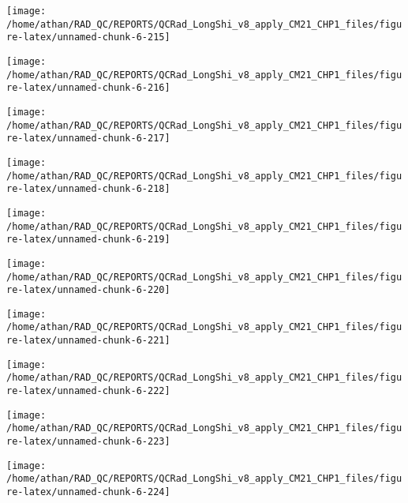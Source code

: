 \documentclass[
  10pt,
  a4paper,oneside]{article}
\begin{document}
\begin{center}\texttt{[image: /home/athan/RAD\_QC/REPORTS/QCRad\_LongShi\_v8\_apply\_CM21\_CHP1\_files/figure-latex/unnamed-chunk-6-215]} \end{center}

\begin{center}\texttt{[image: /home/athan/RAD\_QC/REPORTS/QCRad\_LongShi\_v8\_apply\_CM21\_CHP1\_files/figure-latex/unnamed-chunk-6-216]} \end{center}

\begin{center}\texttt{[image: /home/athan/RAD\_QC/REPORTS/QCRad\_LongShi\_v8\_apply\_CM21\_CHP1\_files/figure-latex/unnamed-chunk-6-217]} \end{center}

\begin{center}\texttt{[image: /home/athan/RAD\_QC/REPORTS/QCRad\_LongShi\_v8\_apply\_CM21\_CHP1\_files/figure-latex/unnamed-chunk-6-218]} \end{center}

\begin{center}\texttt{[image: /home/athan/RAD\_QC/REPORTS/QCRad\_LongShi\_v8\_apply\_CM21\_CHP1\_files/figure-latex/unnamed-chunk-6-219]} \end{center}

\begin{center}\texttt{[image: /home/athan/RAD\_QC/REPORTS/QCRad\_LongShi\_v8\_apply\_CM21\_CHP1\_files/figure-latex/unnamed-chunk-6-220]} \end{center}

\begin{center}\texttt{[image: /home/athan/RAD\_QC/REPORTS/QCRad\_LongShi\_v8\_apply\_CM21\_CHP1\_files/figure-latex/unnamed-chunk-6-221]} \end{center}

\begin{center}\texttt{[image: /home/athan/RAD\_QC/REPORTS/QCRad\_LongShi\_v8\_apply\_CM21\_CHP1\_files/figure-latex/unnamed-chunk-6-222]} \end{center}

\begin{center}\texttt{[image: /home/athan/RAD\_QC/REPORTS/QCRad\_LongShi\_v8\_apply\_CM21\_CHP1\_files/figure-latex/unnamed-chunk-6-223]} \end{center}

\begin{center}\texttt{[image: /home/athan/RAD\_QC/REPORTS/QCRad\_LongShi\_v8\_apply\_CM21\_CHP1\_files/figure-latex/unnamed-chunk-6-224]} \end{center}
\end{document}
